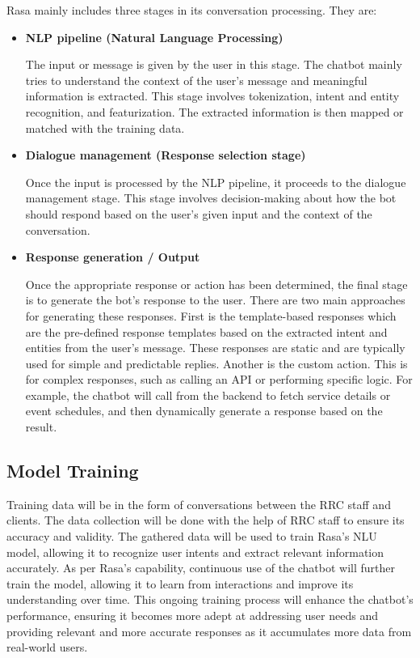 Rasa mainly includes three stages in its conversation processing. They are:

\begin{itemize}
	\item \textbf{NLP pipeline (Natural Language Processing)}
	
	The input or message is given by the user in this stage. The chatbot mainly tries to understand the context of the user’s message and meaningful information is extracted. This stage involves tokenization, intent and entity recognition, and featurization. The extracted information is then mapped or matched with the training data.
	
	\item \textbf{Dialogue management (Response selection stage)}
	
	Once the input is processed by the NLP pipeline, it proceeds to the dialogue management stage. This stage involves decision-making about how the bot should respond based on the user’s given input and the context of the conversation. 
	
	\item \textbf{Response generation / Output}
	
	Once the appropriate response or action has been determined, the final stage is to generate the bot’s response to the user.  There are two main approaches for generating these responses. First is the template-based responses which are the pre-defined response templates based on the extracted intent and entities from the user’s message. These responses are static and are typically used for simple and predictable replies. Another is the custom action. This is for complex responses, such as calling an API or performing specific logic. For example, the chatbot will call from the backend to fetch service details or event schedules, and then dynamically generate a response based on the result.
	
\end{itemize}

\subsection{Model Training}

Training data will be in the form of conversations between the RRC staff and clients. The data collection will be done with the help of RRC staff to ensure its accuracy and validity. The gathered data will be used to train Rasa’s NLU model, allowing it to recognize user intents and extract relevant information accurately. As per Rasa’s capability, continuous use of the chatbot will further train the model, allowing it to learn from interactions and improve its understanding over time. This ongoing training process will enhance the chatbot’s performance, ensuring it becomes more adept at addressing user needs and providing relevant and more accurate responses as it accumulates more data from real-world users.
 
